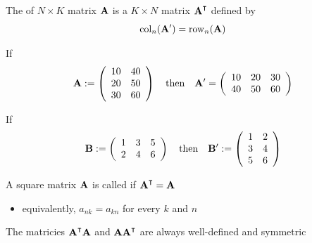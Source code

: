 \begin{frame}
    
    \vspace{2em}
    The  of $N \times K$ matrix $\mathbf A$ is a $K
    \times N$ matrix $\boldA^\T$ defined by 
    $$\operatorname{col}_n(\mathbf A') = \operatorname{row}_n(\mathbf A)$$

    \Eg If
    \begin{equation*}
        \label{eq:aandb}
        \mathbf A := 
        \left(
        \begin{array}{cc}
            10 & 40  \\
            20 & 50  \\
            30 & 60
        \end{array}
        \right)
        \quad \text{then} \quad
        \mathbf A' = 
        \left(
        \begin{array}{ccc}
            10 & 20 & 30 \\
            40 & 50 & 60 
        \end{array}
        \right)
    \end{equation*}

    If
    \begin{equation*}
        \mathbf B := 
        \left(
        \begin{array}{ccc}
            1 & 3 & 5 \\
            2 & 4 & 6 \\
        \end{array}
        \right)
        \quad \text{then} \quad
        \mathbf B' := 
        \left(
        \begin{array}{cc}
            1 & 2  \\
            3 & 4  \\
            5 & 6 
        \end{array}
        \right)
    \end{equation*}

\end{frame}

\begin{frame}

    \vspace{2em}
    A square matrix $\mathbf A$ is called  if $\boldA^\T = \boldA$
    \begin{itemize}
        \item equivalently, $a_{nk} = a_{kn}$ for every $k$ and $n$
    \end{itemize}
    
    \vspace{.7em}
    The matricies $\boldA^\T
    \boldA$ and $\boldA \boldA^\T$ are always well-defined and symmetric
    
\end{frame}

